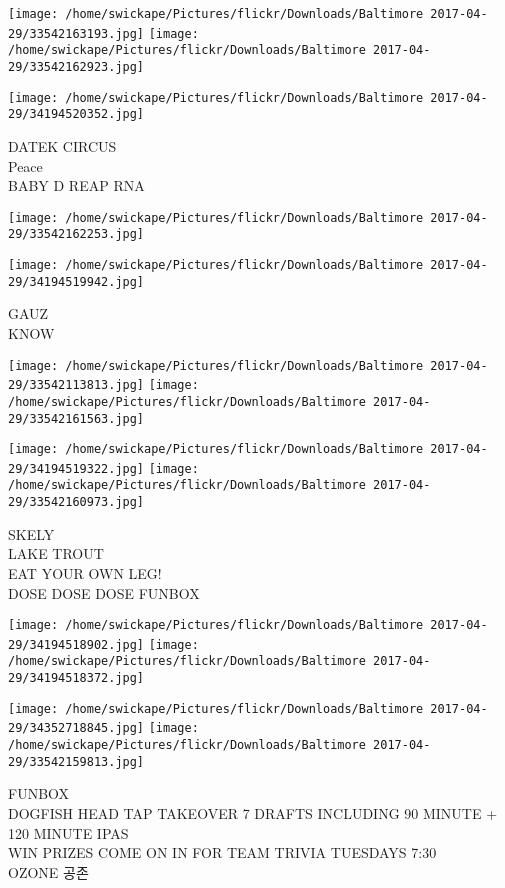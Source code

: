 \documentclass[10pt,letterpaper]{article}
\begin{document}
\texttt{[image: /home/swickape/Pictures/flickr/Downloads/Baltimore 2017-04-29/33542163193.jpg]}
\texttt{[image: /home/swickape/Pictures/flickr/Downloads/Baltimore 2017-04-29/33542162923.jpg]}

\texttt{[image: /home/swickape/Pictures/flickr/Downloads/Baltimore 2017-04-29/34194520352.jpg]}

DATEK CIRCUS\\
Peace\\
BABY D REAP RNA\\
\pagebreak

\texttt{[image: /home/swickape/Pictures/flickr/Downloads/Baltimore 2017-04-29/33542162253.jpg]}

\vspace{0.25in}
\texttt{[image: /home/swickape/Pictures/flickr/Downloads/Baltimore 2017-04-29/34194519942.jpg]}

GAUZ\\
KNOW\\
\pagebreak

\texttt{[image: /home/swickape/Pictures/flickr/Downloads/Baltimore 2017-04-29/33542113813.jpg]}
\texttt{[image: /home/swickape/Pictures/flickr/Downloads/Baltimore 2017-04-29/33542161563.jpg]}

\texttt{[image: /home/swickape/Pictures/flickr/Downloads/Baltimore 2017-04-29/34194519322.jpg]}
\texttt{[image: /home/swickape/Pictures/flickr/Downloads/Baltimore 2017-04-29/33542160973.jpg]}

SKELY\\
LAKE TROUT\\
EAT YOUR OWN LEG!\\
DOSE DOSE DOSE FUNBOX\\
\pagebreak

\texttt{[image: /home/swickape/Pictures/flickr/Downloads/Baltimore 2017-04-29/34194518902.jpg]}
\texttt{[image: /home/swickape/Pictures/flickr/Downloads/Baltimore 2017-04-29/34194518372.jpg]}

\texttt{[image: /home/swickape/Pictures/flickr/Downloads/Baltimore 2017-04-29/34352718845.jpg]}
\texttt{[image: /home/swickape/Pictures/flickr/Downloads/Baltimore 2017-04-29/33542159813.jpg]}

FUNBOX\\
DOGFISH HEAD TAP TAKEOVER 7 DRAFTS INCLUDING 90 MINUTE + 120 MINUTE IPAS\\
WIN PRIZES COME ON IN FOR TEAM TRIVIA TUESDAYS 7:30\\
OZONE 공존\\
\pagebreak
\end{document}
